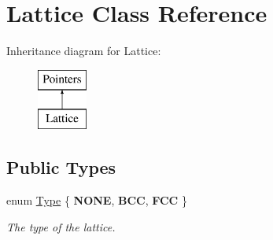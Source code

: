 \hypertarget{classLattice}{}\section{Lattice Class Reference}
\label{classLattice}
Inheritance diagram for Lattice\+:\begin{figure}[H]
\begin{center}
\leavevmode
\includegraphics[height=2.000000cm]{classLattice}
\end{center}
\end{figure}
\subsection*{Public Types}
\begin{DoxyCompactItemize}
\item 
\mbox{\label{classLattice_a0521158021627f01f6bb0a9c72df65e2}} 
enum \mbox{\hyperlink{classLattice_a0521158021627f01f6bb0a9c72df65e2}{Type}} \{ {\bfseries N\+O\+NE}, 
{\bfseries B\+CC}, 
{\bfseries F\+CC}
 \}
\begin{DoxyCompactList}\small\item\em The type of the lattice. \end{DoxyCompactList}\end{DoxyCompactItemize}
